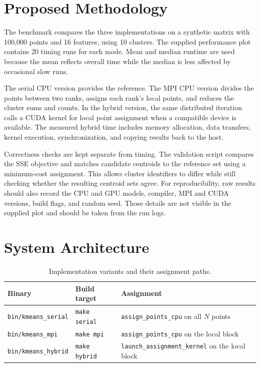 \documentclass[conference]{IEEEtran}
\DeclareRobustCommand{\code}[1]{\texttt{#1}}
\begin{document}
\section{Proposed Methodology}
\label{sec:methodology}
The benchmark compares the three implementations on a synthetic matrix with 100,000 points and 16 features, using 10 clusters. The supplied performance plot contains 20 timing runs for each mode. Mean and median runtime are used because the mean reflects overall time while the median is less affected by occasional slow runs.

The serial CPU version provides the reference. The MPI CPU version divides the points between two ranks, assigns each rank's local points, and reduces the cluster sums and counts. In the hybrid version, the same distributed iteration calls a CUDA kernel for local point assignment when a compatible device is available. The measured hybrid time includes memory allocation, data transfers, kernel execution, synchronization, and copying results back to the host.

Correctness checks are kept separate from timing. The validation script compares the SSE objective and matches candidate centroids to the reference set using a minimum-cost assignment. This allows cluster identifiers to differ while still checking whether the resulting centroid sets agree. For reproducibility, raw results should also record the CPU and GPU models, compiler, MPI and CUDA versions, build flags, and random seed. Those details are not visible in the supplied plot and should be taken from the run logs.

\section{System Architecture}
\label{sec:architecture}

\begin{table}[t]
\centering
\caption{Implementation variants and their assignment paths.}
\label{tab:binaries}
\renewcommand{\arraystretch}{1.2}
\begin{tabularx}{\textwidth}{@{}p{1.7in} p{1.25in} X@{}}
\toprule
\textbf{Binary} & \textbf{Build target} & \textbf{Assignment} \\
\midrule
\code{bin/kmeans\_serial}  & \code{make serial} & \code{assign\_points\_cpu} on all $N$ points \\
\code{bin/kmeans\_mpi}     & \code{make mpi}    & \code{assign\_points\_cpu} on the local block \\
\code{bin/kmeans\_hybrid}  & \code{make hybrid} & \code{launch\_assignment\_kernel} on the local block \\
\bottomrule
\end{tabularx}
\end{table}
\end{document}
